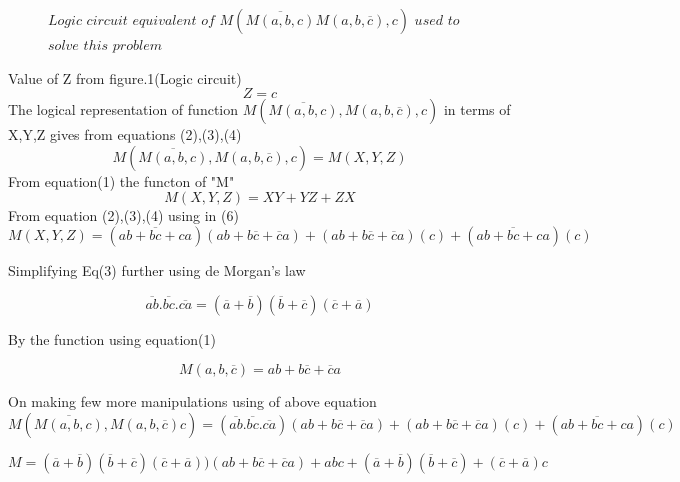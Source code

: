 \documentclass{article}
\begin{document}
\begin{figure}[]
\centering

\caption{$Logic$ $circuit$ $equivalent$ $of$ $M(\overline{M(a,b,c)} M(a,b,\overline{c}),c) $ $used$ $to$ $solve$ $this$ $problem$}
\label{logic}
\end{figure}  


Value of Z from figure.1(Logic circuit)
\begin{equation}
    Z=c
\end{equation}
The logical representation of function $M(\overline{M(a,b,c)}, M(a,b,\overline{c}),c)$ in terms of X,Y,Z gives from equations (2),(3),(4)
\begin{equation}
    M(\overline{M(a,b,c)},M(a,b,\overline{c}),c)=M(X,Y,Z)
\end{equation}
From equation(1) the functon of "M"
\begin{equation}
    M(X,Y,Z)=XY+YZ+ZX
\end{equation}
From equation (2),(3),(4) using in (6)
\begin{equation}
    M(X,Y,Z)=(\overline{ab+bc+ca})(ab+b\overline{c}+\overline{c}a)+(ab+b\overline{c}+\overline{c}a)(c)+(\overline{ab+bc+ca})(c)
\end{equation}

Simplifying Eq(3) further using de Morgan's law 

\begin{equation}
\overline{ab}.\overline{bc}.\overline{ca}=(\overline{a}+\overline{b})(\overline{b}+\overline{c})(\overline{c}+\overline{a})  
\end{equation}

By the function using equation(1)

\begin{equation}
M(a,b,\overline{c})=ab+b\overline{c}+\overline{c}a
\end{equation}

On making few more manipulations using of above equation
\begin{equation}
M(\overline{M(a, b ,c )} ,M(a,b,\overline{c})c)=(\overline{ab}.\overline{bc}.\overline{ca})(ab+b\overline{c}+\overline{c}a)+(ab+b\overline{c}+\overline{c}a)(c)+(\overline{ab+bc+ca})(c)
\end{equation}


\begin{equation}
M=(\overline{a}+\overline{b})(\overline{b}+\overline{c})(\overline{c}+\overline{a}))(ab+b\overline{c}+\overline{c}a)+abc+(\overline{a}+\overline{b})(\overline{b}+\overline{c})+(\overline{c}+\overline{a})c
\end{equation}
\end{document}

